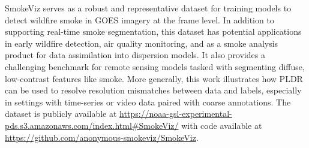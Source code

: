 \documentclass{article}
\begin{document}
SmokeViz serves as a robust and representative dataset for training models to detect wildfire smoke in GOES imagery at the frame level. In addition to supporting real-time smoke segmentation, this dataset has potential applications in early wildfire detection, air quality monitoring, and as a smoke analysis product for data assimilation into dispersion models. It also provides a challenging benchmark for remote sensing models tasked with segmenting diffuse, low-contrast features like smoke. More generally, this work illustrates how PLDR can be used to resolve resolution mismatches between data and labels, especially in settings with time-series or video data paired with coarse annotations. The dataset is publicly available at \url{https://noaa-gsl-experimental-pds.s3.amazonaws.com/index.html#SmokeViz/} with code available at \url{https://github.com/anonymous-smokeviz/SmokeViz}. 




\end{document}
